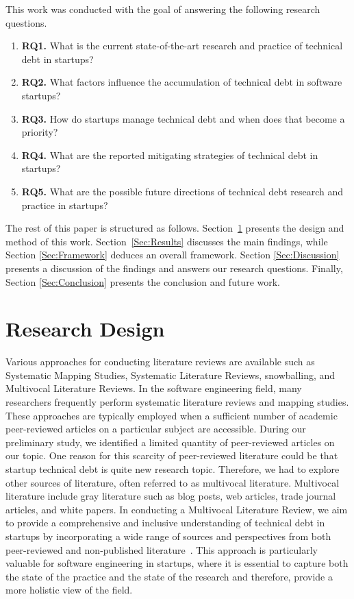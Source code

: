 This work was conducted with the goal of answering the following research questions.
\begin{enumerate}
\item \textbf{RQ1.} What is the current state-of-the-art research and practice of technical debt in startups?
\item \textbf{RQ2.} What factors influence the accumulation of technical debt in software startups?
\item \textbf{RQ3.} How do startups manage technical debt and when does that become a priority?
\item \textbf{RQ4.} What are the reported mitigating strategies of technical debt in startups?
\item \textbf{RQ5.} What are the possible future directions of technical debt research and practice in startups?
\end{enumerate}

The rest of this paper is structured as follows.
Section~\ref{Sec:Research} presents the design and method of this work.
Section~\ref{Sec:Results} discusses the main findings, while Section \ref{Sec:Framework} deduces an overall framework. Section \ref{Sec:Discussion} presents a discussion of the findings and answers our research questions.
Finally, Section \ref{Sec:Conclusion} presents the conclusion and future work.

\section{Research Design}\label{Sec:Research}
Various approaches for conducting literature reviews are available such as Systematic Mapping Studies, Systematic Literature Reviews, snowballing, and Multivocal Literature Reviews.
In the software engineering field, many researchers frequently perform systematic literature reviews and mapping studies.
These approaches are typically employed when a sufficient number of academic peer-reviewed articles on a particular subject are accessible.
During our preliminary study, we identified a limited quantity of peer-reviewed articles on our topic.
One reason for this scarcity of peer-reviewed literature could be that startup technical debt is quite new research topic.
Therefore, we had to explore other sources of literature, often referred to as multivocal literature.
Multivocal literature include gray literature such as blog posts, web articles, trade journal articles, and white papers.
In conducting a Multivocal Literature Review, we aim to provide a comprehensive and inclusive understanding of technical debt in startups by incorporating a wide range of sources and perspectives from both peer-reviewed and non-published literature~\cite{Ogawa91, Garousi2016/2915970.2916008}.
This approach is particularly valuable for software engineering in startups, where it is essential to capture both the state of the practice and the state of the research and therefore, provide a more holistic view of the field. 

